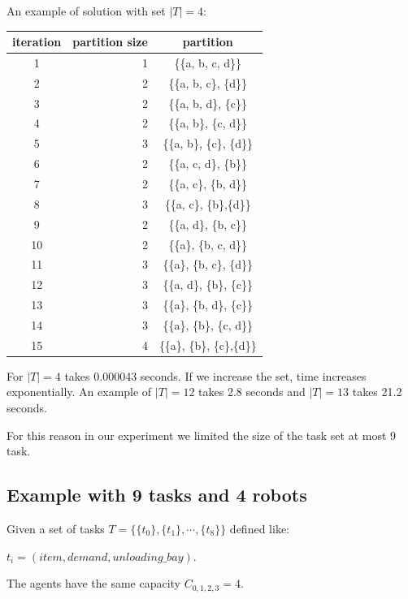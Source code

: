 \newpage
An example of solution with set $|T| = 4$:
\begin{center}
  \begin{tabular}{|c|r|c|} \hline
  \textbf{iteration} & \textbf{partition size} & \textbf{partition} \\ \hline
  1    & 1    & \{\{a, b, c, d\}\}   \\
  2    & 2    & \{\{a, b, c\}, \{d\}\}   \\
  3    & 2    & \{\{a, b, d\}, \{c\}\}   \\
  4    & 2    & \{\{a, b\}, \{c, d\}\}   \\
  5    & 3    & \{\{a, b\}, \{c\}, \{d\}\}   \\
  6    & 2    & \{\{a, c, d\}, \{b\}\}   \\
  7    & 2    & \{\{a, c\}, \{b, d\}\}   \\
  8    & 3    & \{\{a, c\}, \{b\},\{d\}\}   \\
  9    & 2    & \{\{a, d\}, \{b, c\}\}   \\
  10   & 2    & \{\{a\}, \{b, c, d\}\}   \\
  11   & 3    & \{\{a\}, \{b, c\}, \{d\}\}   \\
  12   & 3    & \{\{a, d\}, \{b\}, \{c\}\}   \\
  13   & 3    & \{\{a\}, \{b, d\}, \{c\}\}   \\
  14   & 3    & \{\{a\}, \{b\}, \{c, d\}\}   \\
  15   & 4    & \{\{a\}, \{b\}, \{c\},\{d\}\}   \\ \hline       
  \end{tabular}
\end{center}

For $|T| = 4$ takes 0.000043 seconds. If we increase the set, time increases exponentially.
An example of $|T| = 12$ takes 2.8 seconds and $|T| = 13$ takes 21.2 seconds.

For this reason in our experiment we limited the size of the task set at most 9 task.

\newpage
\subsection*{Example with 9 tasks and 4 robots}
Given a set of tasks $T = \{  \{t_0\}, \{t_1\}, \cdots, \{t_8\} \}$ defined like:

${t_i=(item, demand, unloading\_bay)}$.

The agents have the same capacity $C_{0,1,2,3} = 4$.

